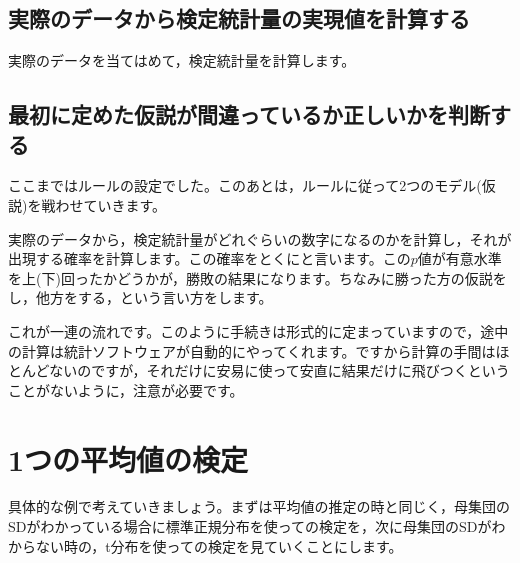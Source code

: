 \documentclass{ltjsbook}
\begin{document}
\subsection{実際のデータから検定統計量の実現値を計算する}

実際のデータを当てはめて，検定統計量を計算します。
\subsection{最初に定めた仮説が間違っているか正しいかを判断する}
ここまではルールの設定でした。このあとは，ルールに従って2つのモデル(仮説)を戦わせていきます。

実際のデータから，検定統計量がどれぐらいの数字になるのかを計算し，それが出現する確率を計算します。この確率をとくにと言います。この$p$値が有意水準を上(下)回ったかどうかが，勝敗の結果になります。ちなみに勝った方の仮説をし，他方をする，という言い方をします。

これが一連の流れです。このように手続きは形式的に定まっていますので，途中の計算は統計ソフトウェアが自動的にやってくれます。ですから計算の手間はほとんどないのですが，それだけに安易に使って安直に結果だけに飛びつくということがないように，注意が必要です。



\section{1つの平均値の検定}
具体的な例で考えていきましょう。まずは平均値の推定の時と同じく，母集団のSDがわかっている場合に標準正規分布を使っての検定を，次に母集団のSDがわからない時の，t分布を使っての検定を見ていくことにします。
\end{document}
